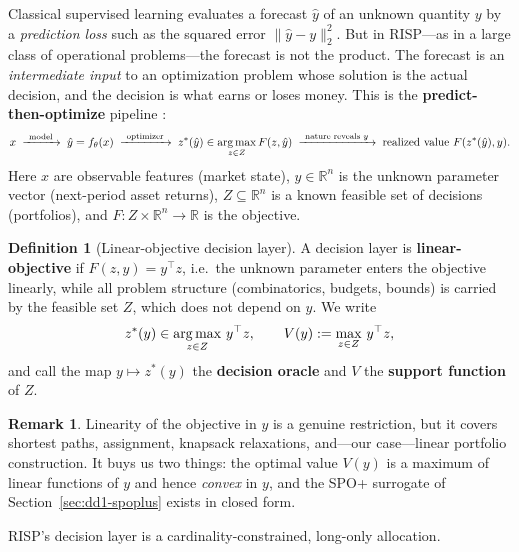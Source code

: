 \documentclass[11pt,a4paper]{article}
\theoremstyle{definition}
\newtheorem{definition}{Definition}[section]
\newtheorem{remark}{Remark}[section]
\theoremstyle{plain}
\newcommand{\R}{\mathbb{R}}
\newcommand{\nm}{\textsc{RISP}}
\newcommand{\argmax}{\operatornamewithlimits{arg\,max}}
\begin{document}
Classical supervised learning evaluates a forecast $\hat{y}$ of an unknown
quantity $y$ by a \emph{prediction loss} such as the squared error
$\|\hat{y}-y\|_2^2$. But in \nm{}---as in a large class of operational
problems---the forecast is not the product. The forecast is an
\emph{intermediate input} to an optimization problem whose solution is the
actual decision, and the decision is what earns or loses money. This is the
\textbf{predict-then-optimize} pipeline \cite{elmachtoub2022smart,
mandi2020smart, mandi2024decision}:
\begin{equation}
\label{eq:dd1-pipeline}
x \;\xrightarrow{\ \text{model}\ }\; \hat{y} = f_\theta(x)
\;\xrightarrow{\ \text{optimizer}\ }\; z^*(\hat{y}) \in \argmax_{z \in Z}
F(z, \hat{y})
\;\xrightarrow{\ \text{nature reveals } y\ }\; \text{realized value } F(z^*(\hat{y}), y).
\end{equation}
Here $x$ are observable features (market state), $y \in \R^n$ is the unknown
parameter vector (next-period asset returns), $Z \subseteq \R^n$ is a known
feasible set of decisions (portfolios), and $F : Z \times \R^n \to \R$ is the
objective.

\begin{definition}[Linear-objective decision layer]
\label{def:dd1-linear-layer}
A decision layer is \textbf{linear-objective} if $F(z, y) = y^\top z$, i.e.\
the unknown parameter enters the objective linearly, while all problem
structure (combinatorics, budgets, bounds) is carried by the feasible set $Z$,
which does not depend on $y$. We write
\begin{equation}
\label{eq:dd1-oracle-def}
z^*(y) \in \argmax_{z \in Z} \, y^\top z, \qquad
V(y) := \max_{z \in Z} \, y^\top z ,
\end{equation}
and call the map $y \mapsto z^*(y)$ the \textbf{decision oracle} and $V$ the
\textbf{support function} of $Z$.
\end{definition}

\begin{remark}
Linearity of the objective in $y$ is a genuine restriction, but it covers
shortest paths, assignment, knapsack relaxations, and---our case---linear
portfolio construction. It buys us two things: the optimal value $V(y)$ is a
maximum of linear functions of $y$ and hence \emph{convex} in $y$, and the SPO+
surrogate of Section~\ref{sec:dd1-spoplus} exists in closed form.
\end{remark}

\nm{}'s decision layer is a cardinality-constrained, long-only allocation.
\end{document}

